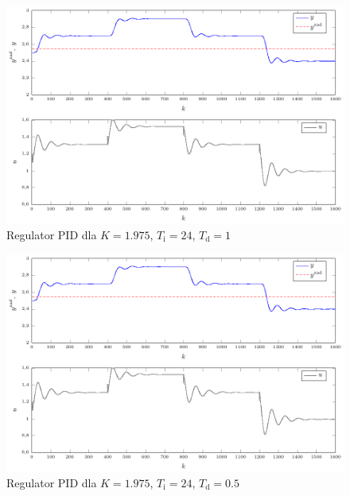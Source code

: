 \begin{figure}[tb] 
\centering 
\includegraphics[scale=1]{rysunki/zapisz_pdf/PID_K=1.975_Ti=24.00_Td=1.00.pdf} 
\caption{Regulator PID dla $K=\num{1.975}$, $T_{\mathrm{i}}=24$, $T_{\mathrm{d}}=1$} 
\label{r_pgfplots_PID_K=1.975_Ti=24.00_Td=1.00} 
\end{figure}

\begin{figure}[tb] 
\centering 
\includegraphics[scale=1]{rysunki/zapisz_pdf/PID_K=1.975_Ti=24.00_Td=0.50.pdf} 
\caption{Regulator PID dla $K=\num{1.975}$, $T_{\mathrm{i}}=24$, $T_{\mathrm{d}}=\num{0.5}$} 
\label{r_pgfplots_PID_K=1.975_Ti=24.00_Td=0.50} 
\end{figure}

